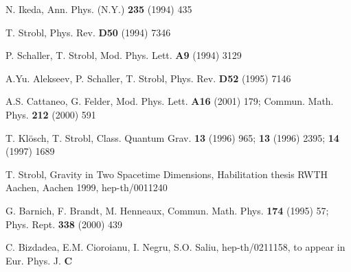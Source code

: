 \documentclass[a4paper,12pt]{article}
\begin{document}
\begin{thebibliography}{99}
  N. Ikeda, Ann. Phys. (N.Y.) \textbf{235} (1994) 435

  T. Strobl, Phys. Rev. \textbf{D50} (1994) 7346

  P. Schaller, T. Strobl, Mod. Phys. Lett. \textbf{A9} (1994)
3129

  A.Yu. Alekseev, P. Schaller, T. Strobl, Phys. Rev. \textbf{%
D52} (1995) 7146

  A.S. Cattaneo, G. Felder, Mod. Phys. Lett. \textbf{A16}
(2001) 179; Commun. Math. Phys. \textbf{212} (2000) 591

  T. Kl\"{o}sch, T. Strobl, Class. Quantum Grav. \textbf{13}
(1996) 965; \textbf{13} (1996) 2395; \textbf{14} (1997) 1689

  T. Strobl, Gravity in Two Spacetime Dimensions, Habilitation
thesis RWTH Aachen, Aachen 1999, hep-th/0011240

  G. Barnich, F. Brandt, M. Henneaux, Commun. Math. Phys.
\textbf{174} (1995) 57; Phys. Rept. \textbf{338} (2000) 439

  C. Bizdadea, E.M. Cioroianu, I. Negru, S.O. Saliu,
hep-th/0211158, to appear in Eur. Phys. J. \textbf{C}
\end{thebibliography}
\end{document}
